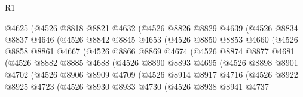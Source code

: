 \begin{lexlean}{R1}
\begin{coremodule}
                  @4625
                  (@4526
                    @8818
                    @8821
                    @4632
                    (@4526
                      @8826
                      @8829
                      @4639
                      (@4526
                        @8834
                        @8837
                        @4646
                        (@4526
                          @8842
                          @8845
                          @4653
                          (@4526
                            @8850
                            @8853
                            @4660
                            (@4526
                              @8858
                              @8861
                              @4667
                              (@4526
                                @8866
                                @8869
                                @4674
                                (@4526
                                  @8874
                                  @8877
                                  @4681
                                  (@4526
                                    @8882
                                    @8885
                                    @4688
                                    (@4526
                                      @8890
                                      @8893
                                      @4695
                                      (@4526
                                        @8898
                                        @8901
                                        @4702
                                        (@4526
                                          @8906
                                          @8909
                                          @4709
                                          (@4526
                                            @8914
                                            @8917
                                            @4716
                                            (@4526
                                              @8922
                                              @8925
                                              @4723
                                              (@4526
                                                @8930
                                                @8933
                                                @4730
                                                (@4526
                                                  @8938
                                                  @8941
                                                  @4737

\end{coremodule}
\end{lexlean}
